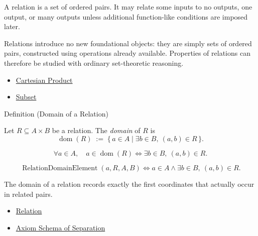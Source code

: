 \begin{remark*}[Interpretation]
A relation is a set of ordered pairs. It may relate some inputs to no outputs,
one output, or many outputs unless additional function-like conditions are
imposed later.
\end{remark*}

\begin{remark*}[Exposition]
Relations introduce no new foundational objects: they are simply sets of
ordered pairs, constructed using operations already available. Properties of
relations can therefore be studied with ordinary set-theoretic reasoning.
\end{remark*}

\begin{dependencies}
\begin{itemize}
  \item \hyperref[def:cartesian-product-rel]{Cartesian Product}
  \item \hyperref[def:subset]{Subset}
\end{itemize}
\end{dependencies}

\begin{definitionbox}{Definition (Domain of a Relation)}
\begin{definition}\label{def:relation-domain}
Let $R\subseteq A\times B$ be a relation. The \emph{domain} of $R$ is
\[
\operatorname{dom}(R)
\;:=\;
\{\,a\in A\mid \exists b\in B,\ (a,b)\in R\,\}.
\]
\end{definition}
\end{definitionbox}

\begin{remark*}
\[
  \forall a\in A,\quad
  a\in\operatorname{dom}(R)
  \iff
  \exists b\in B,\ (a,b)\in R.
\]
\end{remark*}

\begin{remark*}
\[
  \operatorname{RelationDomainElement}(a,R,A,B)
  \iff
  a\in A \wedge \exists b\in B,\ (a,b)\in R.
\]
\end{remark*}

\begin{remark*}[Interpretation]
The domain of a relation records exactly the first coordinates that actually
occur in related pairs.
\end{remark*}

\begin{dependencies}
\begin{itemize}
  \item \hyperref[def:relation]{Relation}
  \item \hyperref[ax:separation]{Axiom Schema of Separation}
\end{itemize}
\end{dependencies}

